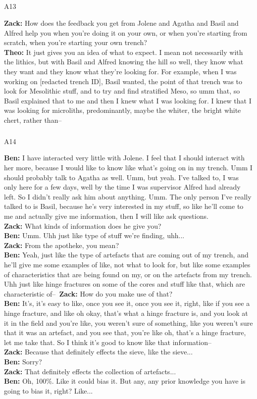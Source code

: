 \documentclass[
]{article}
\makeatletter
\let\oldsubparagraph\subparagraph
\renewcommand{\subparagraph}{
    \@ifstar
      \xxxSubParagraphStar
      \xxxSubParagraphNoStar
  }
\newcommand{\xxxSubParagraphStar}[1]{\oldsubparagraph*{#1}\mbox{}}
\newcommand{\xxxSubParagraphNoStar}[1]{\oldsubparagraph{#1}\mbox{}}
\makeatother
\begin{document}
\subparagraph{A13}\label{sec-A13}

\textbf{Zack:} How does the feedback you get from Jolene and Agatha and
Basil and Alfred help you when you're doing it on your own, or when
you're starting from scratch, when you're starting your own trench?\\
\textbf{Theo:} It just gives you an idea of what to expect. I mean not
necessarily with the lithics, but with Basil and Alfred knowing the hill
so well, they know what they want and they know what they're looking
for. For example, when I was working on {[}redacted trench ID{]}, Basil
wanted, the point of that trench was to look for Mesolithic stuff, and
to try and find stratified Meso, so umm that, so Basil explained that to
me and then I knew what I was looking for. I knew that I was looking for
microliths, predominantly, maybe the whiter, the bright white chert,
rather than--

\subparagraph{A14}\label{sec-A14}

\textbf{Ben:} I have interacted very little with Jolene. I feel that I
should interact with her more, because I would like to know like what's
going on in my trench. Umm I should probably talk to Agatha as well.
Umm, but yeah. I've talked to, I was only here for a few days, well by
the time I was supervisor Alfred had already left. So I didn't really
ask him about anything. Umm. The only person I've really talked to is
Basil, because he's very interested in my stuff, so like he'll come to
me and actually give me information, then I will like ask questions.\\
\textbf{Zack:} What kinds of information does he give you?\\
\textbf{Ben:} Umm. Uhh just like type of stuff we're finding, uhh...\\
\textbf{Zack:} From the apotheke, you mean?\\
\textbf{Ben:} Yeah, just like the type of artefacts that are coming out
of my trench, and he'll give me some examples of like, not what to look
for, but like some examples of characteristics that are being found on
my, or on the artefacts from my trench. Uhh just like hinge fractures on
some of the cores and stuff like that, which are characteristic
of--~\textbf{Zack:} How do you make use of that?\\
\textbf{Ben:} It's, it's easy to like, once you see it, once you see it,
right, like if you see a hinge fracture, and like oh okay, that's what a
hinge fracture is, and you look at it in the field and you're like, you
weren't sure of something, like you weren't sure that it was an
artefact, and you see that, you're like oh, that's a hinge fracture, let
me take that. So I think it's good to know like that information--\\
\textbf{Zack:} Because that definitely effects the sieve, like the
sieve...\\
\textbf{Ben:} Sorry?\\
\textbf{Zack:} That definitely effects the collection of artefacts...\\
\textbf{Ben:} Oh, 100\%. Like it could bias it. But any, any prior
knowledge you have is going to bias it, right? Like...
\end{document}

